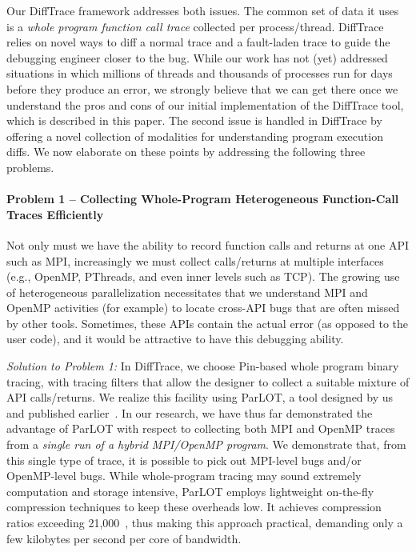 Our DiffTrace framework addresses both issues.
%
The common set of data it uses is a {\em whole program
function call trace} collected per process/thread.
%
DiffTrace relies on
novel ways to diff a normal trace and a fault-laden trace to guide the
debugging engineer closer to the bug.
%
While our work has not (yet) addressed situations in
which millions of threads and thousands of processes run
for days before they produce an error,
we strongly believe that we can get there
once we understand the pros and cons of our initial
implementation of the DiffTrace tool, which is described in this paper.
%
The second issue is handled in DiffTrace by offering a novel
collection of modalities for understanding program execution diffs.
%
We now elaborate on these points by addressing the following three problems.



\paragraph{Problem 1 -- Collecting Whole-Program Heterogeneous Function-Call Traces
Efficiently\/} Not only must we have the ability
to record function calls and returns at one
API such as MPI, increasingly we must collect calls/returns at multiple
interfaces (e.g., OpenMP, PThreads, and even inner levels such as TCP).
%
The growing use of heterogeneous parallelization necessitates that we 
understand MPI and OpenMP activities (for example) to locate cross-API
bugs that are often missed by other tools.
%
Sometimes, these APIs contain the actual error (as opposed to the user code), and it would be attractive to have this debugging ability.


{\em Solution to Problem 1:\/}
In DiffTrace, we choose Pin-based whole program binary tracing, with
tracing filters that allow the designer to collect a suitable mixture of API
calls/returns.
%
We realize this facility using
ParLOT, a tool designed by us and published earlier~\cite{parlot}.
%
In our research, we have thus far demonstrated the advantage of
ParLOT with respect to collecting both MPI and OpenMP traces
from a {\em single run of a hybrid MPI/OpenMP program}.
%
We demonstrate that, from this single type of trace, it is possible
to pick out MPI-level bugs and/or OpenMP-level bugs.
%
While whole-program tracing
may sound extremely computation and storage intensive, ParLOT employs
lightweight on-the-fly compression techniques to keep these overheads low.
%
It achieves compression ratios exceeding 21,000~\cite{parlot},
thus making this approach practical, demanding
only a few kilobytes per second per core of bandwidth.


